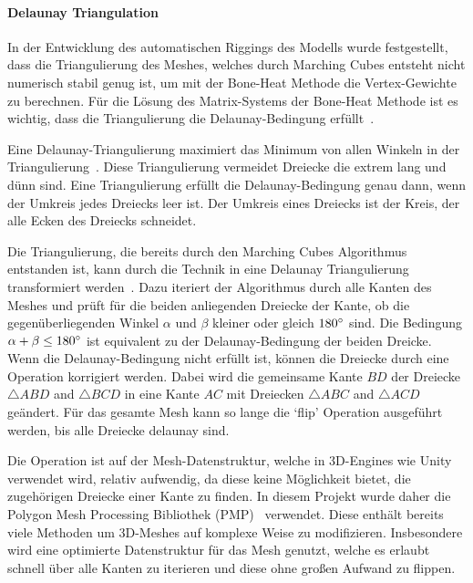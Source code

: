 \paragraph{Delaunay Triangulation}
In der Entwicklung des automatischen Riggings des Modells wurde festgestellt, dass die Triangulierung des Meshes, welches durch Marching Cubes entsteht nicht numerisch stabil genug ist, um mit der Bone-Heat Methode die Vertex-Gewichte zu berechnen. Für die Lösung des Matrix-Systems der Bone-Heat Methode ist es wichtig, dass die Triangulierung die Delaunay-Bedingung erfüllt~\cite{laplace_beltrami_paper}.

Eine Delaunay-Triangulierung maximiert das Minimum von allen Winkeln in der Triangulierung~\cite{delaunay}. Diese Triangulierung vermeidet Dreiecke die extrem lang und dünn sind. Eine Triangulierung erfüllt die Delaunay-Bedingung genau dann, wenn der Umkreis jedes Dreiecks leer ist. Der Umkreis eines Dreiecks ist der Kreis, der alle Ecken des Dreiecks schneidet.

Die Triangulierung, die bereits durch den Marching Cubes Algorithmus entstanden ist, kann durch die \grqq{} Technik in eine Delaunay Triangulierung transformiert werden~\cite{delaunay}. Dazu iteriert der Algorithmus durch alle Kanten des Meshes und prüft für die beiden anliegenden Dreiecke der Kante, ob die gegenüberliegenden Winkel $\alpha$ und $\beta$ kleiner oder gleich $180\degree$ sind. Die Bedingung $\alpha+\beta \leq 180\degree$ ist equivalent zu der Delaunay-Bedingung der beiden Dreicke. Wenn die Delaunay-Bedingung nicht erfüllt ist, können die Dreiecke durch eine \grqq{} Operation korrigiert werden. Dabei wird die gemeinsame Kante $BD$ der Dreiecke $\triangle ABD$ and $\triangle BCD$ in eine Kante $AC$ mit Dreiecken $\triangle ABC$ and $\triangle ACD$ geändert. Für das gesamte Mesh kann so lange die `flip' Operation ausgeführt werden, bis alle Dreiecke delaunay sind.

Die \grqq{} Operation ist auf der Mesh-Datenstruktur, welche in 3D-Engines wie Unity verwendet wird, relativ aufwendig, da diese keine Möglichkeit bietet, die zugehörigen Dreiecke einer Kante zu finden. In diesem Projekt wurde daher die Polygon Mesh Processing Bibliothek (PMP)~\cite{pmp-library} verwendet. Diese enthält bereits viele Methoden um 3D-Meshes auf komplexe Weise zu modifizieren. Insbesondere wird eine optimierte Datenstruktur für das Mesh genutzt, welche es erlaubt schnell über alle Kanten zu iterieren und diese ohne großen Aufwand zu flippen.

